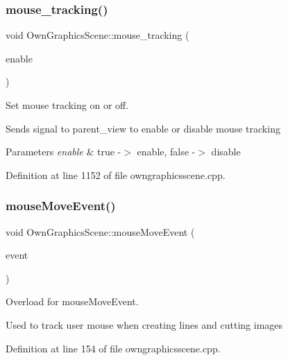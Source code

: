 \subsubsection{\texorpdfstring{mouse\+\_\+tracking()}{mouse\_tracking()}}
{\footnotesize\ttfamily void Own\+Graphics\+Scene\+::mouse\+\_\+tracking (\begin{DoxyParamCaption}\item[{bool}]{enable }\end{DoxyParamCaption})}



Set mouse tracking on or off. 

Sends signal to parent\+\_\+view to enable or disable mouse tracking 
\begin{DoxyParams}{Parameters}
{\em enable} & true -\/$>$ enable, false -\/$>$ disable \\
\hline
\end{DoxyParams}


Definition at line 1152 of file owngraphicsscene.\+cpp.

\mbox{\label{classOwnGraphicsScene_ac7f6be2800f09463413459fed74bf34e}} 
\subsubsection{\texorpdfstring{mouse\+Move\+Event()}{mouseMoveEvent()}}
{\footnotesize\ttfamily void Own\+Graphics\+Scene\+::mouse\+Move\+Event (\begin{DoxyParamCaption}\item[{Q\+Graphics\+Scene\+Mouse\+Event $\ast$}]{event }\end{DoxyParamCaption})}



Overload for mouse\+Move\+Event. 

Used to track user mouse when creating lines and cutting images 

Definition at line 154 of file owngraphicsscene.\+cpp.

\mbox{\label{classOwnGraphicsScene_a1a9916971af608d5331483606f72fbe4}} 
